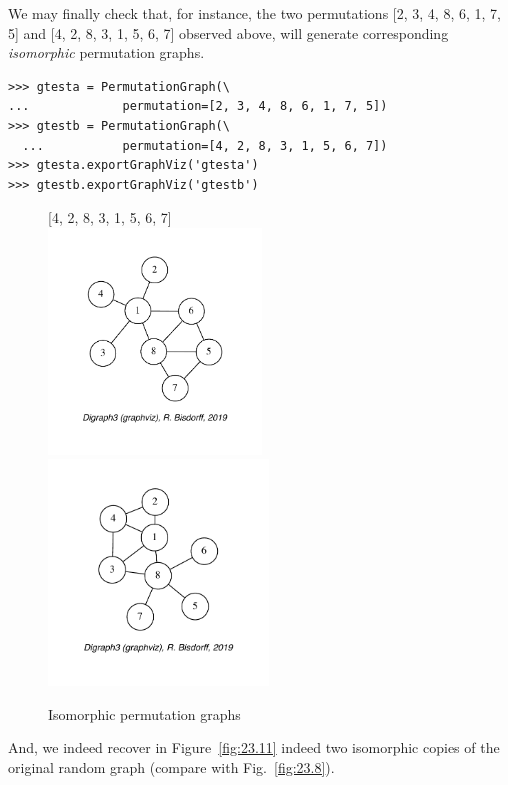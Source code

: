 We may finally check that, for instance, the two permutations [2, 3, 4, 8, 6, 1, 7, 5] and [4, 2, 8, 3, 1, 5, 6, 7] observed above, will generate corresponding \emph{isomorphic} permutation graphs.
\begin{lstlisting}  
>>> gtesta = PermutationGraph(\
...             permutation=[2, 3, 4, 8, 6, 1, 7, 5])
>>> gtestb = PermutationGraph(\
  ...           permutation=[4, 2, 8, 3, 1, 5, 6, 7])
>>> gtesta.exportGraphViz('gtesta')
>>> gtestb.exportGraphViz('gtestb')
\end{lstlisting}
\begin{figure}[ht]
  [2, 3, 4, 8, 6, 1, 7, 5]\hfill [4, 2, 8, 3, 1, 5, 6, 7]\\
  \includegraphics[height=6cm]{Figures/23-11-gtesta.pdf}\hfill
  \includegraphics[height=6cm]{Figures/23-11-gtestb.pdf}
\caption{Isomorphic permutation graphs} 
\label{fig:23.11}       %
\end{figure}
And, we indeed recover in Figure~\vref{fig:23.11} indeed two isomorphic copies of the original random graph (compare with Fig.~\vref{fig:23.8}).
 
%


